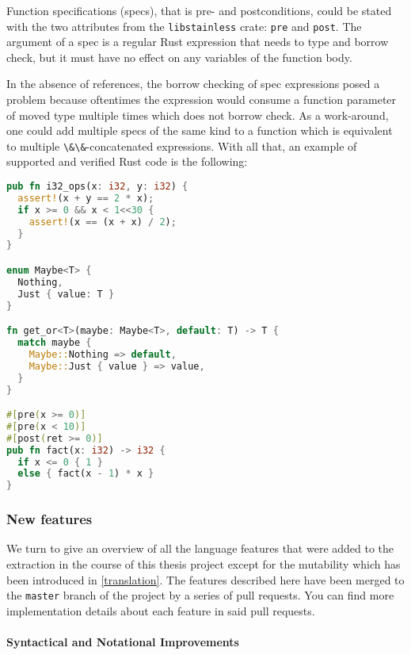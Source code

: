 Function specifications (specs), that is pre- and postconditions, could
be stated with the two attributes from the
\passthrough{\lstinline!libstainless!} crate:
\passthrough{\lstinline!pre!} and \passthrough{\lstinline!post!}. The
argument of a spec is a regular Rust expression that needs to type and
borrow check, but it must have no effect on any variables of the
function body.

In the absence of references, the borrow checking of spec expressions
posed a problem because oftentimes the expression would consume a
function parameter of moved type multiple times which does not borrow
check. As a work-around, one could add multiple specs of the same kind
to a function which is equivalent to multiple
\passthrough{\lstinline!\&\&!}-concatenated expressions. With all that,
an example of supported and verified Rust code is the following:

\begin{lstlisting}[language=Rust]
pub fn i32_ops(x: i32, y: i32) {
  assert!(x + y == 2 * x);
  if x >= 0 && x < 1<<30 {
    assert!(x == (x + x) / 2);
  }
}

enum Maybe<T> {
  Nothing,
  Just { value: T }
}

fn get_or<T>(maybe: Maybe<T>, default: T) -> T {
  match maybe {
    Maybe::Nothing => default,
    Maybe::Just { value } => value,
  }
}

#[pre(x >= 0)]
#[pre(x < 10)]
#[post(ret >= 0)]
pub fn fact(x: i32) -> i32 {
  if x <= 0 { 1 }
  else { fact(x - 1) * x }
}
\end{lstlisting}

\subsubsection{New features}

We turn to give an overview of all the language features that were added
to the extraction in the course of this thesis project except for the
mutability which has been introduced in \autoref{translation}. The
features described here have been merged to the
\passthrough{\lstinline!master!} branch of the project by a series of
pull requests. You can find more implementation details about each
feature in said pull requests.

\paragraph{Syntactical and Notational Improvements}

